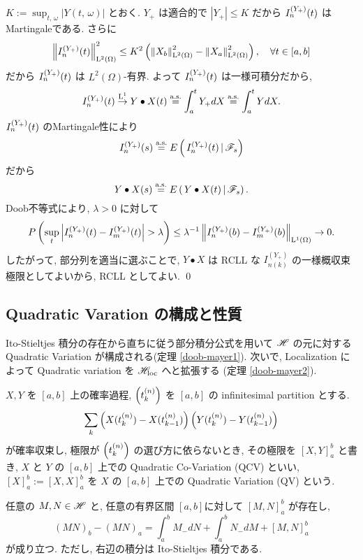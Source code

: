 \documentclass{ltjsarticle}
\begin{document}
\begin{prf} 
	\( K := \sup_{ t,\, \omega} | Y(t,\,\omega) | \) とおく.
	\( Y_{+} \) は適合的で \( | Y_{+} | \le K \) だから \( I_n^{ ( Y_{+} ) }(t) \) はMartingaleである. 
	さらに
	\[
		\left\|  I_n^{ ( Y_{+} ) }(t)  \right\|_{\mathrm{L}^2(\Omega)}^2 \le K^2 \left( \left\| X_b \right\|_{\mathrm{L}^2(\Omega)}^2 - \left\| X_a \right\|_{\mathrm{L}^2(\Omega)}^2 \right),
		\quad \forall t \in [a,b]
	\]
	だから \( I_n^{ ( Y_{+} ) }(t) \) は \( L^2 ( \Omega ) \)-有界.
	よって \( I_n^{ ( Y_{+} ) }(t) \) は一様可積分だから, 
	\[
		I_n^{ ( Y_{+} ) }(t) \stackrel{ \mathrm{L}^1 }{ \to } Y \bullet X (t) \stackrel{ \text{a.s.} }{ = } \int_a^t Y_{+} dX \stackrel{ \text{a.s.} }{ = } \int_a^t Y dX.
	\]
	\( I_n^{ ( Y_{+} ) }(t) \) のMartingale性により
	\[
		I_n^{ ( Y_{+} ) }(s) \stackrel{ \text{a.s.} }{ = } E \left(\, I_n^{ ( Y_{+} ) }(t) \,|\, \mathscr{F}_s \right)
	\]
	だから
	\[
		Y \bullet X (s) \stackrel{ \text{a.s.} }{ = } E \left(\, Y \bullet X (t) \,|\, \mathscr{F}_s \right).
	\]
	Doob不等式により, \( \lambda > 0 \) に対して
	\[
		P \left( \sup_t \left| I_n^{ (Y_{+}) }(t) - I_m^{ (Y_{+}) }(t) \right| > \lambda \right)
		\le \lambda^{-1} \left\|  I_n^{ (Y_{+}) }(b) - I_m^{ (Y_{+}) }(b)  \right\|_{\mathrm{L}^1(\Omega)} \to 0.
	\]
	したがって, 部分列を適当に選ぶことで, \( Y \bullet X \) は
	RCLL な \( I_{n(k)}^{(Y_{+})} \) の一様概収束極限としてよいから, RCLL としてよい.
	\qed\end{prf}

\subsection{Quadratic Varation の構成と性質}

Ito-Stieltjes 積分の存在から直ちに従う部分積分公式を用いて \( \mathscr{H} \) の元に対する Quadratic Variation が構成される(定理 \ref{doob-mayer1}).
次いで, Localization によって Quadratic variation を \( \mathscr{H}_{\mathrm{loc}} \) へと拡張する (定理 \ref{doob-mayer2}).

\begin{dfn}	\label{def: naive QV}
	\( X, Y \) を \( [a,b] \) 上の確率過程, \( \left( t_k^{(n)} \right) \) を \( [a,b] \) の infinitesimal partition とする.
	\[
		\sum_k \left( X( t_k^{(n)} ) - X( t_{k-1}^{(n)} ) \right)
		\left( Y( t_k^{(n)} ) - Y( t_{k-1}^{(n)} ) \right)
	\]
	が確率収束し, 極限が \( \left( t_k^{(n)} \right) \) の選び方に依らないとき,
	その極限を \( [X,Y]_a^b \) と書き, \( X \) と \( Y \) の \( [a,b] \) 上での
	Quadratic Co-Variation (QCV) といい,
	\( [X]_a^b := [X,X]_a^b \)
	を \( X \) の \( [a,b] \) 上での Quadratic Variation (QV) という.
	\fin\end{dfn}

\begin{thm}[部分積分公式]	\label{integration by parts}
	任意の \( M, N \in \mathscr{H} \) と, 任意の有界区間 \( [a,b] \)に対して \( [M,N]_a^b \) が存在し,
	\[
		( MN )_b - ( MN )_a
		=
		\int_a^b M_{-} dN + \int_a^b N_{-} dM + [M,N]_a^b
	\]
	が成り立つ.
	ただし, 右辺の積分は Ito-Stieltjes 積分である.
\end{thm}
\end{document}
